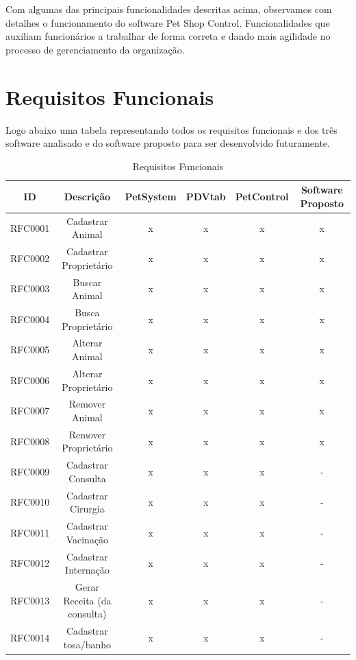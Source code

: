 \documentclass[12pt,openright,twoside,a4paper,english,french,spanish,brazil]{abntex2}
\begin{document}
Com algumas das principais funcionalidades descritas acima, observamos com detalhes o funcionamento do software Pet Shop Control. Funcionalidades que auxiliam funcionários a trabalhar de forma correta e dando mais agilidade no processo de gerenciamento da organização.
\newpage
\section*{Requisitos Funcionais}
Logo abaixo uma tabela representando todos os requisitos funcionais e dos três software analisado e do software proposto para ser desenvolvido futuramente.

\newpage
\begin{landscape}
\begin{table}[!htpb]
\centering
\caption{Requisitos Funcionais}\label{tab_requisitosFuncionais}
\begin{small} 
\setlength{\tabcolsep}{3pt} 
\begin{tabular}{rccccc}
    \toprule
    \multicolumn{1}{c}{\textbf{ID}} & \textbf{Descrição} & \textbf{PetSystem} & \textbf{PDVtab} & \textbf{PetControl} & \textbf{Software Proposto} \\
    \midrule
    RFC0001 & Cadastrar Animal & x & x & x & x \\
    RFC0002 & Cadastrar Proprietário & x & x & x & x \\
    RFC0003 & Buscar Animal & x & x & x & x \\
    RFC0004 & Busca Proprietário & x & x & x & x \\
    RFC0005 & Alterar Animal & x & x & x & x \\
    RFC0006 & Alterar Proprietário & x & x & x & x \\
    RFC0007 & Remover Animal & x & x & x & x \\
    RFC0008 & Remover Proprietário & x & x & x & x \\
    RFC0009 & Cadastrar Consulta & x & x & x & - \\
    RFC0010 & Cadastrar Cirurgia & x & x & x & - \\
    RFC0011 & Cadastrar Vacinação & x & x & x & - \\
    RFC0012 & Cadastrar Internação & x & x & x & - \\
    RFC0013 & Gerar Receita (da consulta) & x & x & x & - \\
    RFC0014 & Cadastrar tosa/banho & x & x & x & - \\

\end{tabular}
\end{small}
\end{table}
\end{landscape}
\end{document}
